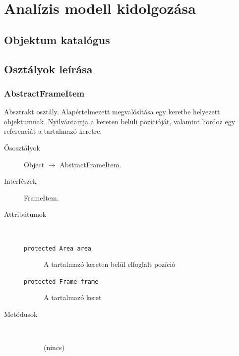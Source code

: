 



\fedlap

\addtocounter{section}{2}
\section{Analízis modell kidolgozása}

	\subsection{Objektum katalógus}
	
	\subsection{Osztályok leírása}
	
		\subsubsection{AbstractFrameItem} Absztrakt osztály.
				 Alapértelmezett megvalósítása egy keretbe helyezett objektumnak.   Nyilvántartja a kereten belüli pozícióját, valamint hordoz  egy referenciát a tartalmazó keretre. 			\begin{description}


				\item[Ősosztályok] Object $\rightarrow{}$ AbstractFrameItem.
				\item[Interfészek] FrameItem.
				\item[Attribútumok]$\ $
					\begin{description}
						\item[\texttt{protected Area area}] A tartalmazó kereten belül elfoglalt pozíció 
						\item[\texttt{protected Frame frame}] A tartalmazó keret 
					\end{description}
				\item[Metódusok]$\ $
					\begin{description}
						\item[] (nincs)
					\end{description}
			\end{description}

